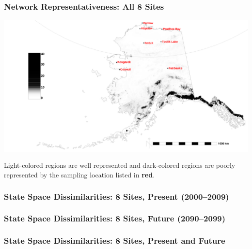 \begin{frame}
 \frametitle{Network Representativeness: All 8 Sites}
 \includegraphics[width=\textwidth]{ngee_figures/alaska_2000_2009_dem_Feb2012_k1000ness_8sites.pdf} \\
  \vbox{\scriptsize\hfill\citep{Hoffman_LandscapeEcol_20131001}}

\medskip
Light-colored regions are well represented and dark-colored regions are
poorly represented by the sampling location listed in \textbf{\color{red}red}.
\end{frame}

\begin{frame}
 \frametitle{State Space Dissimilarities: 8 Sites, Present (2000--2009)}
 


\end{frame}

\begin{frame}
 \frametitle{State Space Dissimilarities: 8 Sites, Future (2090--2099)}
 


\end{frame}

\begin{frame}
 \frametitle{State Space Dissimilarities: 8 Sites, Present and Future}
 


\end{frame}

